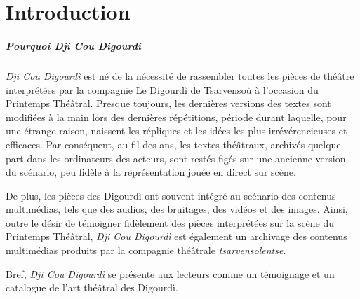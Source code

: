 \chapter*{Introduction} 




\paragraph*{Pourquoi \textit{Dji Cou Digourdì}}
\textit{Dji Cou Digourdì} est né de la nécessité de rassembler toutes les pièces de théâtre interprétées par la compagnie Le Digourdì de Tsarvensoù à l'occasion du Printemps Thé\^atral. Presque toujours, les dernières versions des textes sont modifiées à la main lors des dernières répétitions, période durant laquelle, pour une étrange raison, naissent les répliques et les idées les plus irrévérencieuses et efficaces. Par conséquent, au fil des ans, les textes théâtraux, archivés quelque part dans les ordinateurs des acteurs, sont restés figés sur une ancienne version du scénario, peu fidèle à la représentation jouée en direct sur scène.

De plus, les pièces des Digourdì ont souvent intégré au scénario des contenus multimédias, tels que des audios, des bruitages, des vidéos et des images. Ainsi, outre le désir de témoigner fidèlement des pièces interprétées sur la scène du Printemps Thé\^atral, \textit{Dji Cou Digourdì} est également un archivage des contenus multimédias produits par la compagnie théâtrale \textit{tsarvensolentse}.

Bref, \textit{Dji Cou Digourdì} se présente aux lecteurs comme un témoignage et un catalogue de l'art théâtral des Digourdì.

